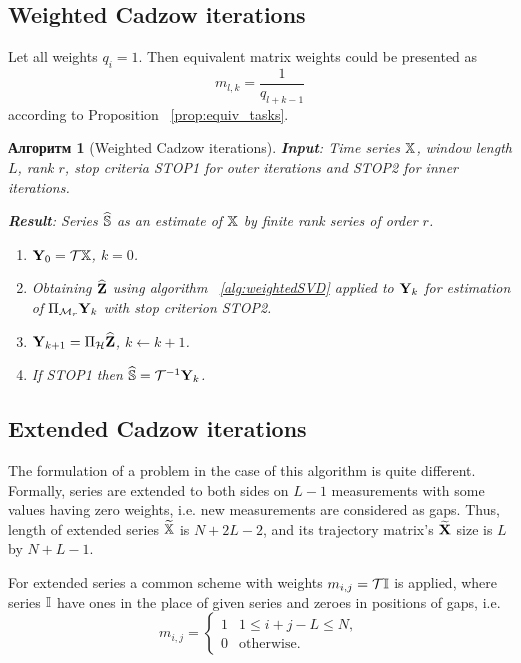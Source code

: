 \documentclass[12pt,a4paper,fleqn,leqno]{article}
\newtheorem{algorithm}{Алгоритм}
\begin{document}
\subsection{Weighted Cadzow iterations}

Let all weights $q_{i}=1$. Then equivalent matrix weights could be presented as
\begin{equation}
\label{Mw}
   m_{l, k} = \frac{1}{q_{l + k - 1}}
\end{equation}
according to Proposition ~\ref{prop:equiv_tasks}.

\begin{algorithm}[Weighted Cadzow iterations]
\textbf{Input}: Time series $\mathbb{X}$, window length $L$, rank $r$,
stop criteria STOP1 for outer iterations and STOP2 for inner iterations.

\textbf{Result}:
Series $\widehat{\mathbb{S}}$ as an estimate of $\mathbb{X}$ by finite rank series of order $r$.

\begin{enumerate}
\item
$\mathbf{Y}_0 = \mathcal{T} \mathbb{X}$, $k=0$.
\item
Obtaining $\widehat{\mathbf{Z}}$ using algorithm ~\ref{alg:weightedSVD} applied to $\mathbf{Y}_k$ for estimation of $\Pi_{\mathcal{M}_r} \mathbf{Y}_{k}$ with stop criterion STOP2.
\item
$\mathbf{Y}_{k+1} = \Pi_{\mathcal{H}}  \widehat{\mathbf{Z}}$, $k\leftarrow k+1$.
\item
If STOP1 then $\widehat{\mathbb{S}} = \mathcal{T}^{-1} \mathbf{Y}_k$.
\end{enumerate}
\end{algorithm}

\subsection{Extended Cadzow iterations}

The formulation of a problem in the case of this algorithm is quite different.
Formally, series are extended to both sides on $L-1$ measurements with some values having zero weights, i.e. new measurements are considered as gaps.
Thus, length of extended series $\widetilde{\mathbb{X}}$ is $N+2L-2$, and its trajectory matrix's $\widetilde{\mathbf{X}}$ size is $L$ by $N+L-1$.

For extended series a common scheme with weights $m_{i,j}=\mathcal{T} \mathbb{I}$ is applied, where series $\mathbb{I}$ have ones in the place of given series and zeroes in positions of gaps, i.e.
\begin{equation*}
m_{i,j} = \begin{cases}
1 & 1 \le i+j-L \le N, \\
0 & \text{otherwise.}
\end{cases}
\end{equation*}
\end{document}
